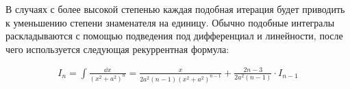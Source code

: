 \begin{itemize}
\begin{example}
  \begin{remark}
    В случаях с более высокой степенью каждая подобная итерация будет приводить
    к уменьшению степени знаменателя на единицу. Обычно подобные интегралы
    раскладываются с помощью подведения под дифференциал и линейности, после
    чего используется следующая рекуррентная формула:

    \begin{align*}
      I_{n}
      = \int \frac{\dd x}{(x^2 + a^2)^n}
      = \frac{x}{2 a^2 (n - 1) (x^2 + a^2)^{n - 1}}
        + \frac{2n - 3}{2 a^2 (n - 1)} \cdot I_{n - 1}
    \end{align*}
  \end{remark}
\end{example}

\end{itemize}
